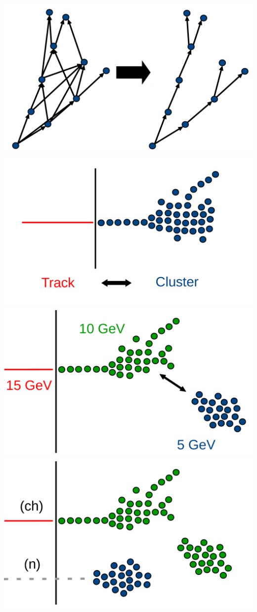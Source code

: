 \documentclass[8pt]{beamer}
\begin{document}
\begin{frame}
\begin{minipage}{0.39\linewidth}
\begin{overprint}
         \centering \includegraphics[width=0.8\linewidth]{ConnectCleanIntro.pdf}
         \centering \includegraphics[width=0.8\linewidth]{TrackClusterAssociationIntro.pdf}
         \centering \includegraphics[width=0.8\linewidth]{TopologicalAssociationsIntro.pdf}
         \centering \includegraphics[width=0.8\linewidth]{PfoCreationIntro.pdf}
      \end{overprint}
    \end{minipage}
  \end{frame}
\end{document}
